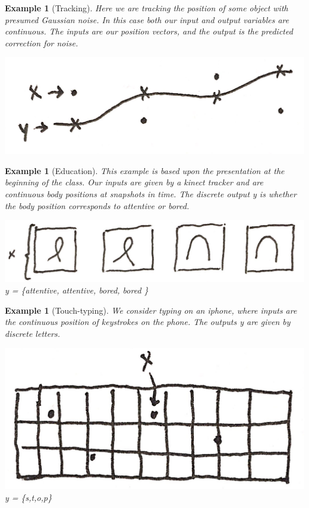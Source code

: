 \documentclass{article}
\newtheorem{example}[theorem]{Example}
\begin{document}
\begin{example}[Tracking]
Here we are tracking the position of some object with presumed Gaussian noise. In this case both our input and output variables are continuous. The inputs are our position vectors, and the output is the predicted correction for noise.
\begin{center}
\includegraphics[scale=.1]{Tracking} 
\end{center}
\end{example}
\begin{example}[Education]
This example is based upon the presentation at the beginning of the class. Our inputs are given by a kinect tracker and are continuous body positions at snapshots in time. The discrete output y is whether the body position corresponds to attentive or bored.
\begin{center}
\includegraphics[scale=.1]{education} \\
y = \{attentive, attentive, bored, bored \}
\end{center}
\end{example}
\begin{example}[Touch-typing]
We consider typing on an iphone, where inputs are the continuous position of keystrokes on the phone. The outputs y are given by discrete letters.
\begin{center}
\includegraphics[scale=.1]{TouchTyping} \\
y = \{s,t,o,p\}
\end{center}
\end{example}
\end{document}
